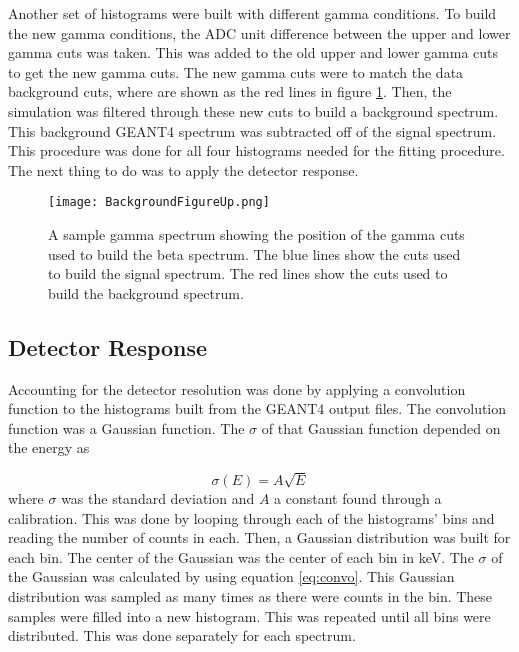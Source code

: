 \documentclass[../MaxHughesThesis.tex]{subfiles}
\begin{document}
Another set of histograms were built with different gamma conditions.
To build the new gamma conditions, the ADC unit difference between the upper and lower gamma cuts was taken.
This was added to the old upper and lower gamma cuts to get the new gamma cuts.
The new gamma cuts were to match the data background cuts, where are shown as the red lines in figure \ref{fig:backgroundsubbeta}. 
Then, the simulation was filtered through these new cuts to build a background spectrum.
This background GEANT4 spectrum was subtracted off of the signal spectrum.
This procedure was done for all four histograms needed for the fitting procedure.
The next thing to do was to apply the detector response. 

\begin{figure}[!htb]
        \centerline{\texttt{[image: BackgroundFigureUp.png]}}
        \caption{A sample gamma spectrum showing the position of the gamma cuts used to build the beta spectrum.
		 The blue lines show the cuts used to build the signal spectrum.
		 The red lines show the cuts used to build the background spectrum.
                   }
        \label{fig:backgroundsubbeta}
\end{figure}
\subsection{Detector Response}
\label{sec:convolution}
Accounting for the detector resolution was done by applying a convolution function to the histograms built from the GEANT4 output files.
The convolution function was a Gaussian function. 
The $\sigma$ of that Gaussian function depended on the energy as

\begin{equation}
	\sigma(E) = A\sqrt{E}
	\label{eq:convo}
\end{equation}
where $\sigma$ was the standard deviation and $A$ a constant found through a calibration.
This was done by looping through each of the histograms' bins and reading the number of counts in each.
Then, a Gaussian distribution was built for each bin.
The center of the Gaussian was the center of each bin in keV.
The $\sigma$ of the Gaussian was calculated by using equation \ref{eq:convo}.
This Gaussian distribution was sampled as many times as there were counts in the bin.
These samples were filled into a new histogram.
This was repeated until all bins were distributed.
This was done separately for each spectrum. 
\end{document}

